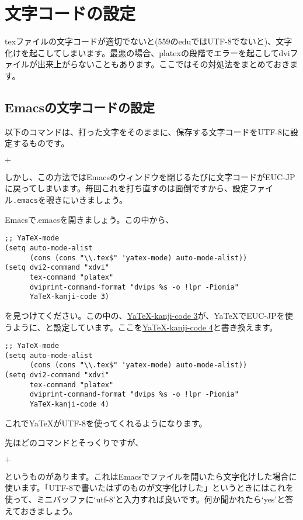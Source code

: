 
\appendix


\section{文字コードの設定}
texファイルの文字コードが適切でないと(559のeduではUTF-8でないと)、文字化けを起こしてしまいます。最悪の場合、platexの段階でエラーを起こしてdviファイルが出来上がらないこともあります。ここではその対処法をまとめておきます。

\subsection{Emacsの文字コードの設定}
以下のコマンドは、打った文字をそのままに、保存する文字コードをUTF-8に設定するものです。
\begin{screen}
$+$  
\end{screen}
しかし、この方法ではEmacsのウィンドウを閉じるたびに文字コードがEUC-JPに戻ってしまいます。毎回これを打ち直すのは面倒ですから、設定ファイル\verb+.emacs+を覗きにいきましょう。

Emacsで.emacsを開きましょう。この中から、
\begin{screen}
\begin{verbatim}
;; YaTeX-mode
(setq auto-mode-alist
      (cons (cons "\\.tex$" 'yatex-mode) auto-mode-alist))
(setq dvi2-command "xdvi"
      tex-command "platex"
      dviprint-command-format "dvips %s -o !lpr -Pionia"
      YaTeX-kanji-code 3)
\end{verbatim}
\end{screen}
を見つけてください。この中の、\underline{YaTeX-kanji-code 3}が、YaTeXでEUC-JPを使うように、と設定しています。ここを\underline{YaTeX-kanji-code 4}と書き換えます。
\begin{screen}
\begin{verbatim}
;; YaTeX-mode
(setq auto-mode-alist
      (cons (cons "\\.tex$" 'yatex-mode) auto-mode-alist))
(setq dvi2-command "xdvi"
      tex-command "platex"
      dviprint-command-format "dvips %s -o !lpr -Pionia"
      YaTeX-kanji-code 4)
\end{verbatim}
\end{screen}
これでYaTeXがUTF-8を使ってくれるようになります。

先ほどのコマンドとそっくりですが、
\begin{screen}
$+$  
\end{screen}
というものがあります。これはEmacsでファイルを開いたら文字化けした場合に使います。「UTF-8で書いたはずのものが文字化けした」というときにはこれを使って、ミニバッファに`utf-8'と入力すれば良いです。何か聞かれたら`yes'と答えておきましょう。

